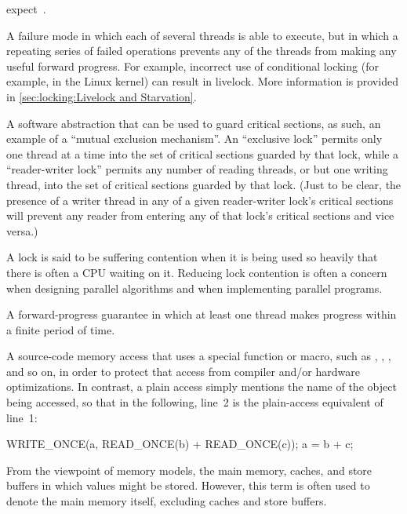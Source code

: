 \begin{description}
	expect~\cite{AndreasHaas2012FIFOisnt}.
\item[\IXG{Livelock}:]
	A failure mode in which each of several threads is able to
	execute, but in which a repeating series of failed operations
	prevents any of the threads from making any useful forward progress.
	For example, incorrect use of conditional locking
	(for example,  in the Linux kernel)
	can result in livelock.
	More information is provided in
	\cref{sec:locking:Livelock and Starvation}.
\item[\IXG{Lock}:]
	A software abstraction that can be used to guard critical sections,
	as such, an example of a ``mutual exclusion mechanism''.
	An ``exclusive lock'' permits only one thread at a time into the
	set of critical sections guarded by that lock, while a
	``reader-writer lock'' permits any number of reading
	threads, or but one writing thread, into the set of critical
	sections guarded by that lock.
	(Just to be clear, the presence	of a writer thread in any of
	a given reader-writer lock's critical sections will prevent
	any reader from entering any of that lock's critical sections
	and vice versa.)
\item[\IXG{Lock Contention}:]
	A lock is said to be suffering contention when it is being
	used so heavily that there is often a CPU waiting on it.
	Reducing lock contention is often a concern when designing
	parallel algorithms and when implementing parallel programs.
\item[\IXG{Lock Free}:]
	A forward-progress guarantee in which at least one thread makes
	progress within a finite period of time.
\item[\IXG{Marked Access}:]
	A source-code memory access that uses a special function or
	macro, such as , ,
	, and so on, in order to protect that access
	from compiler and/or hardware optimizations.
	In contrast, a plain access simply mentions the name of
	the object being accessed, so that in the following, line~2
	is the plain-access equivalent of line~1:
	\begin{VerbatimN}
	WRITE_ONCE(a, READ_ONCE(b) + READ_ONCE(c));
	a = b + c;
	\end{VerbatimN}
\item[\IXG{Memory}:]
	From the viewpoint of memory models, the main memory,
	caches, and store buffers in which values might be stored.
	However, this term is often used to denote the main memory
	itself, excluding caches and store buffers.
\item[\IXG{Memory Barrier}:]

\end{description}
